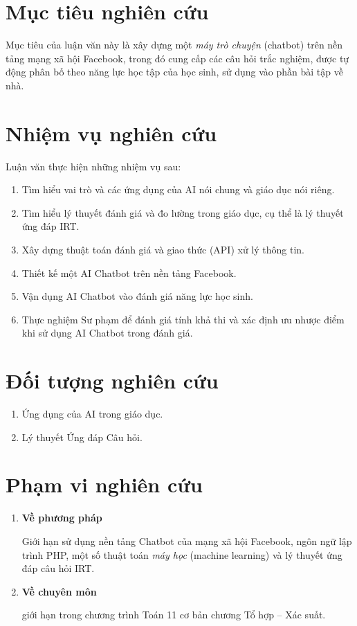 \section{Mục tiêu nghiên cứu}
Mục tiêu của luận văn này là xây dựng một \textit{máy trò chuyện} (chatbot) trên nền tảng mạng xã hội Facebook, trong đó cung cấp các câu hỏi trắc nghiệm, được tự động phân bố theo năng lực học tập của học sinh, sử dụng vào phần bài tập về nhà.

\section{Nhiệm vụ nghiên cứu}
Luận văn thực hiện những nhiệm vụ sau:\par
\begin{enumerate}[label=\textbf{\thesection.\arabic*.},align=left,left=0cm..1cm]
	\item Tìm hiểu vai trò và các ứng dụng của AI nói chung và giáo dục nói riêng.
	\item Tìm hiểu lý thuyết đánh giá và đo lường trong giáo dục, cụ thể là lý thuyết ứng đáp IRT.
	\item Xây dựng thuật toán đánh giá và giao thức (API) xử lý thông tin.
	\item Thiết kế một AI Chatbot trên nền tảng Facebook.
	\item Vận dụng AI Chatbot vào đánh giá năng lực học sinh.
	\item Thực nghiệm Sư phạm để đánh giá tính khả thi và xác định ưu nhược điểm khi sử dụng AI Chatbot trong đánh giá.
\end{enumerate}\par

\section{Đối tượng nghiên cứu}
\begin{enumerate}[label=\textbf{\thesection.\arabic*.},align=left,left=0cm..1cm]
\item Ứng dụng của AI trong giáo dục.\par
\item Lý thuyết Ứng đáp Câu hỏi.\par
\end{enumerate}

\section{Phạm vi nghiên cứu}
\begin{enumerate}[label=\textbf{\thesection.\arabic*.},align=left,left=0cm..1cm]
	\item \textbf{Về phương pháp}\par Giới hạn sử dụng nền tảng Chatbot của mạng xã hội Facebook, ngôn ngữ lập trình PHP, một số thuật toán \textit{máy học} (machine learning) và lý thuyết ứng đáp câu hỏi IRT.\par
	\item \textbf{Về chuyên môn}\par giới hạn trong chương trình Toán 11 cơ bản chương Tổ hợp – Xác suất.\par
\end{enumerate}

